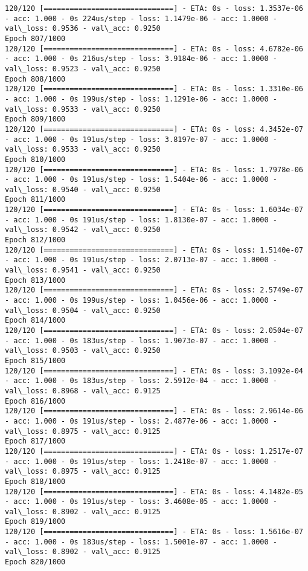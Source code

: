 \documentclass[11pt]{article}
\begin{document}
\begin{Verbatim}[commandchars=\\\{\}]
120/120 [==============================] - ETA: 0s - loss: 1.3537e-06 - acc: 1.000 - 0s 224us/step - loss: 1.1479e-06 - acc: 1.0000 - val\_loss: 0.9536 - val\_acc: 0.9250
Epoch 807/1000
120/120 [==============================] - ETA: 0s - loss: 4.6782e-06 - acc: 1.000 - 0s 216us/step - loss: 3.9184e-06 - acc: 1.0000 - val\_loss: 0.9523 - val\_acc: 0.9250
Epoch 808/1000
120/120 [==============================] - ETA: 0s - loss: 1.3310e-06 - acc: 1.000 - 0s 199us/step - loss: 1.1291e-06 - acc: 1.0000 - val\_loss: 0.9533 - val\_acc: 0.9250
Epoch 809/1000
120/120 [==============================] - ETA: 0s - loss: 4.3452e-07 - acc: 1.000 - 0s 191us/step - loss: 3.8197e-07 - acc: 1.0000 - val\_loss: 0.9533 - val\_acc: 0.9250
Epoch 810/1000
120/120 [==============================] - ETA: 0s - loss: 1.7978e-06 - acc: 1.000 - 0s 191us/step - loss: 1.5404e-06 - acc: 1.0000 - val\_loss: 0.9540 - val\_acc: 0.9250
Epoch 811/1000
120/120 [==============================] - ETA: 0s - loss: 1.6034e-07 - acc: 1.000 - 0s 191us/step - loss: 1.8130e-07 - acc: 1.0000 - val\_loss: 0.9542 - val\_acc: 0.9250
Epoch 812/1000
120/120 [==============================] - ETA: 0s - loss: 1.5140e-07 - acc: 1.000 - 0s 191us/step - loss: 2.0713e-07 - acc: 1.0000 - val\_loss: 0.9541 - val\_acc: 0.9250
Epoch 813/1000
120/120 [==============================] - ETA: 0s - loss: 2.5749e-07 - acc: 1.000 - 0s 199us/step - loss: 1.0456e-06 - acc: 1.0000 - val\_loss: 0.9504 - val\_acc: 0.9250
Epoch 814/1000
120/120 [==============================] - ETA: 0s - loss: 2.0504e-07 - acc: 1.000 - 0s 183us/step - loss: 1.9073e-07 - acc: 1.0000 - val\_loss: 0.9503 - val\_acc: 0.9250
Epoch 815/1000
120/120 [==============================] - ETA: 0s - loss: 3.1092e-04 - acc: 1.000 - 0s 183us/step - loss: 2.5912e-04 - acc: 1.0000 - val\_loss: 0.8968 - val\_acc: 0.9125
Epoch 816/1000
120/120 [==============================] - ETA: 0s - loss: 2.9614e-06 - acc: 1.000 - 0s 191us/step - loss: 2.4877e-06 - acc: 1.0000 - val\_loss: 0.8975 - val\_acc: 0.9125
Epoch 817/1000
120/120 [==============================] - ETA: 0s - loss: 1.2517e-07 - acc: 1.000 - 0s 191us/step - loss: 1.2418e-07 - acc: 1.0000 - val\_loss: 0.8975 - val\_acc: 0.9125
Epoch 818/1000
120/120 [==============================] - ETA: 0s - loss: 4.1482e-05 - acc: 1.000 - 0s 191us/step - loss: 3.4608e-05 - acc: 1.0000 - val\_loss: 0.8902 - val\_acc: 0.9125
Epoch 819/1000
120/120 [==============================] - ETA: 0s - loss: 1.5616e-07 - acc: 1.000 - 0s 183us/step - loss: 1.5001e-07 - acc: 1.0000 - val\_loss: 0.8902 - val\_acc: 0.9125
Epoch 820/1000

\end{Verbatim}
\end{document}
